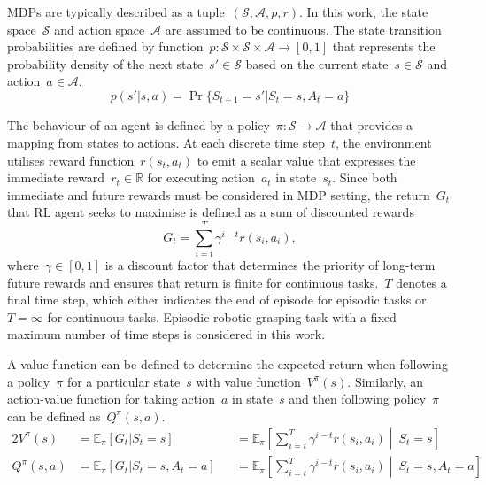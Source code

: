 \newpage

MDPs are typically described as a tuple~\((\mathcal{S}, \mathcal{A}, p, r)\). In this work, the state space~\(\mathcal{S}\) and action space~\(\mathcal{A}\) are assumed to be continuous. The state transition probabilities are defined by function~\(p : \mathcal{S} \times \mathcal{S} \times \mathcal{A} \rightarrow [0, 1]\) that represents the probability density of the next state~\(s' \in \mathcal{S}\) based on the current state~\(s \in \mathcal{S}\) and action~\(a \in \mathcal{A}\).
\begin{equation}
    p(s' \vert s, a) = \Pr\{S_{t+1}{=}s' \vert S_{t}{=}s, A_{t}{=}a\}
\end{equation}

The behaviour of an agent is defined by a policy~\(\pi : \mathcal{S} \rightarrow \mathcal{A}\) that provides a mapping from states to actions. At each discrete time step~\(t\), the environment utilises reward function~\(r(s_{t}, a_{t})\) to emit a scalar value that expresses the immediate reward~\(r_{t} \in \mathbb{R}\) for executing action~\(a_{t}\) in state~\(s_{t}\). Since both immediate and future rewards must be considered in MDP setting, the return~\(G_{t}\) that RL agent seeks to maximise is defined as a sum of discounted rewards
\begin{equation}
    G_{t} = \sum\limits_{i=t}^T \gamma^{i-t} r(s_{i}, a_{i}),
\end{equation}
where~\(\gamma \in [0, 1]\) is a discount factor that determines the priority of long-term future rewards and ensures that return is finite for continuous tasks.~\(T\) denotes a final time step, which either indicates the end of episode for episodic tasks or~\(T=\infty\) for continuous tasks. Episodic robotic grasping task with a fixed maximum number of time steps is considered in this work.

A value function can be defined to determine the expected return when following a policy~\(\pi\) for a particular state~\(s\) with value function~\(V^{\pi}(s)\). Similarly, an action-value function for taking action~\(a\) in state~\(s\) and then following policy~\(\pi\) can be defined as~\(Q^{\pi}(s, a)\).
\begin{alignat}{2}
    V^{\pi}(s)    & = \mathbb{E}_{\pi} [G_{t} \vert S_{t}{=}s]            &  & = \mathbb{E}_{\pi} \left[ \sum\limits_{i=t}^T \gamma^{i-t} r(s_{i}, a_{i}) \middle\vert\ S_{t}{=}s \right]
    \label{eq:state_value_function}                                                                                                                                                                  \\
    Q^{\pi}(s, a) & = \mathbb{E}_{\pi} [G_{t} \vert S_{t}{=}s, A_{t}{=}a] &  & = \mathbb{E}_{\pi} \left[ \sum\limits_{i=t}^T \gamma^{i-t} r(s_{i}, a_{i}) \middle\vert\ S_{t}{=}s, A_{t}{=}a \right]
    \label{eq:action_value_function}
\end{alignat}


